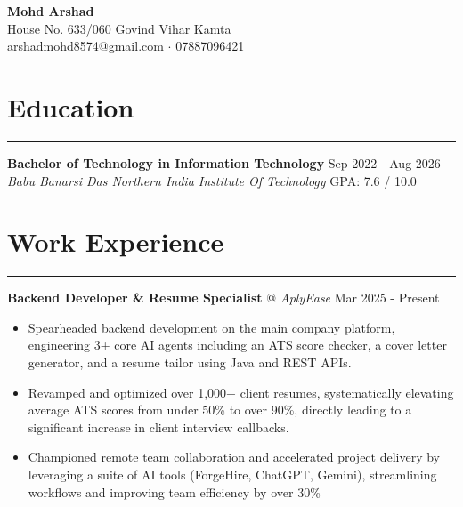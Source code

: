 \documentclass[a4paper,10pt]{article}
\begin{document}
\begin{center}
    {\Huge \textbf{Mohd Arshad}}
    \vspace{2mm} \\
    House No. 633/060 Govind Vihar Kamta \\
    arshadmohd8574@gmail.com $\cdot$ 07887096421
            \end{center}
\vspace{2mm}

\section*{\color{accent}Education}
\hrule \vspace{1mm}
\textbf{Bachelor of Technology in Information Technology} \hfill Sep 2022 - Aug 2026 \\
\textit{Babu Banarsi Das Northern India Institute Of Technology} \hfill GPA: 7.6 / 10.0
\vspace{2mm}

\section*{\color{accent}Work Experience}
\hrule \vspace{1mm}
\textbf{ Backend Developer \& Resume Specialist} @ \textit{AplyEase} \hfill Mar 2025 - Present \\
\begin{itemize} \itemsep-2pt
            \item Spearheaded backend development on the main company platform, engineering 3+ core AI agents including an ATS score checker, a cover letter generator, and a resume tailor using Java and REST APIs.
            \item Revamped and optimized over 1,000+ client resumes, systematically elevating average ATS scores from under 50\% to over 90\%, directly leading to a significant increase in client interview callbacks.
            \item Championed remote team collaboration and accelerated project delivery by leveraging a suite of AI tools (ForgeHire, ChatGPT, Gemini), streamlining workflows and improving team efficiency by over 30\%
    \end{itemize}
\vspace{1mm}

\end{document}
